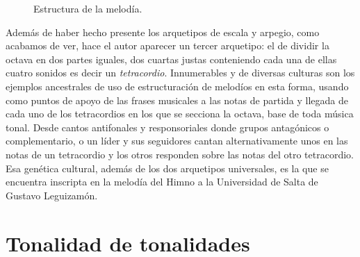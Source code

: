 \begin{figure}[H]
\caption{Estructura de la melodía.}
\label{fig:estructura-melodia}
\end{figure}

Además de haber hecho presente los arquetipos de escala y arpegio, como acabamos de ver, hace el autor aparecer un tercer arquetipo: el de dividir la octava en dos partes iguales, dos cuartas justas conteniendo cada una de ellas cuatro sonidos es decir un \emph{tetracordio}. Innumerables y de diversas culturas son los ejemplos ancestrales de uso de estructuración de melodíos en esta forma, usando como puntos de apoyo de las frases musicales a las notas de partida y llegada de cada uno de los tetracordios en los que se secciona la octava, base de toda música tonal. Desde cantos antifonales y responsoriales donde grupos antagónicos o complementario, o un líder y sus seguidores cantan alternativamente unos en las notas de un tetracordio y los otros responden sobre las notas del otro tetracordio. Esa genética cultural, además de los dos arquetipos universales, es la que se encuentra inscripta en la melodía del Himno a la Universidad de Salta de Gustavo Leguizamón.


\section{Tonalidad de tonalidades}
\label{sec:tonalidad-tonalidades}

